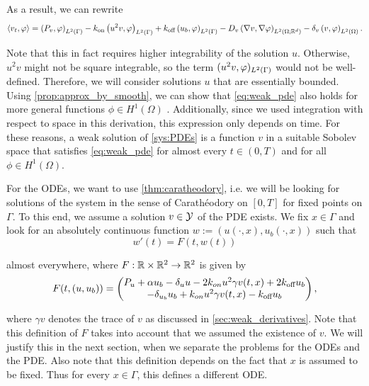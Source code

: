 \noindent
As a result, we can rewrite
%
\begin{equation}\label{eq:weak_pde}
    \left\langle v_t, \varphi \right\rangle = \left( P_v, \varphi \right)_{L^2(\Gamma)} - k_\text{on} \left( u^2 v, \varphi \right)_{L^2(\Gamma)} + k_\text{off} \left( u_b, \varphi \right)_{L^2(\Gamma)} - D_v \left( \nabla v, \nabla \varphi \right)_{L^2(\Omega; \mathbb{R}^d)} - \delta_v \left( v, \varphi \right)_{L^2(\Omega)}.
\end{equation}

Note that this in fact requires higher integrability of the solution $u$. Otherwise, $u^2 v$ might not be square integrable, so the term $(u^2 v, \varphi)_{L^2(\Gamma)}$ would not be well-defined. Therefore, we will consider solutions $u$ that are essentially bounded. Using \cref{prop:approx_by_smooth}, we can show that \cref{eq:weak_pde} also holds for more general functions $\phi \in H^1(\Omega)$ . Additionally, since we used integration with respect to space in this derivation, this expression only depends on time. For these reasons, a weak solution of \cref{sys:PDEs} is a function $v$ in a suitable Sobolev space that satisfies \cref{eq:weak_pde} for almost every $t \in (0, T)$ and for all $\phi \in H^1(\Omega)$. 

For the ODEs, we want to use \cref{thm:caratheodory}, i.e. we will be looking for solutions of the system in the sense of Carath\'eodory on $[0, T]$ for fixed points on $\Gamma$. To this end, we assume a solution $v \in \mathcal{Y}$ of the PDE exists. We fix $x \in \Gamma$ and look for an absolutely continuous function $w := (u(\cdot, x), u_b(\cdot, x))$ such that
%
\begin{equation}\label{eq:weak_ode}
    w'(t) = F(t, w(t))
\end{equation}

\noindent
almost everywhere, where $F: \mathbb{R} \times \mathbb{R}^2 \to \mathbb{R}^2$ is given by
%
\begin{equation}\label{eq:ode_system_function}
    F(t, (u, u_b)) = \begin{pmatrix}
        P_u + \alpha u_b - \delta_u u - 2 k_{on} u^2 \gamma v(t, x) + 2 k_\text{off} u_b \\
        - \delta_{u_b} u_b + k_{on} u^2 \gamma v(t, x) - k_\text{off} u_b
    \end{pmatrix} ,
\end{equation}

\noindent
where $\gamma v$ denotes the trace of $v$ as discussed in \cref{sec:weak_derivatives}. Note that this definition of $F$ takes into account that we assumed the existence of $v$. We will justify this in the next section, when we separate the problems for the ODEs and the PDE. Also note that this definition depends on the fact that $x$ is assumed to be fixed. Thus for every $x \in \Gamma$, this defines a different ODE.


